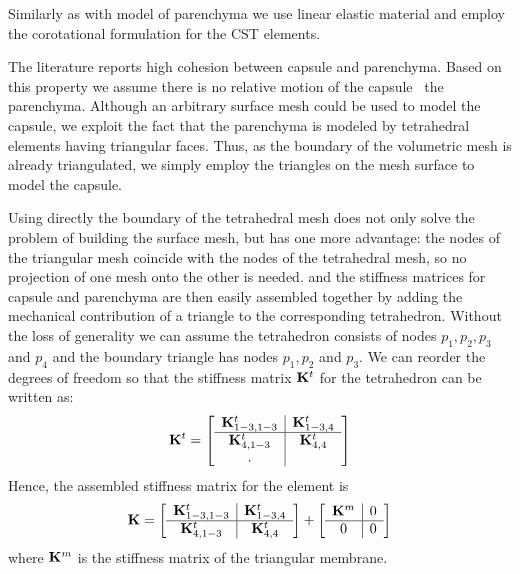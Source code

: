 Similarly as with model of parenchyma we use linear elastic material and employ
the corotational formulation for the CST elements.


The literature reports high cohesion between capsule and parenchyma.
Based on this property we assume there is no relative motion of the capsule \wrt\ the parenchyma.
Although an arbitrary surface mesh could be used to model the capsule, we exploit 
the fact that the parenchyma is modeled by tetrahedral elements having
triangular faces. Thus, as the boundary of the volumetric mesh is already
triangulated, we simply employ the triangles on the mesh surface to model the capsule.

Using directly the boundary of the tetrahedral mesh does not only solve the
problem of building the surface mesh, but has one more advantage: the nodes
of the triangular mesh coincide with the nodes of the tetrahedral mesh, so no projection of one mesh onto the other is needed.
and the stiffness matrices for capsule and parenchyma are then easily assembled together by adding the mechanical contribution 
of a triangle to the corresponding tetrahedron.
%
Without the loss of generality we can assume the tetrahedron consists of
nodes $p_1, p_2, p_3$ and $p_4$ and the boundary triangle has nodes $p_1, p_2$
and $p_3$. We can reorder the degrees of freedom so that the stiffness
matrix $\mathbf{K}^t$ for the tetrahedron can be written as:
%
\begin{equation}
  \mathbf{K}^t = \left[\begin{array}{c|c}
      \mathbf{K}^t_{1-3,1-3} & \mathbf{K}^t_{1-3,4} \\
      \hline
      \mathbf{K}^t_{4,1-3} & \mathbf{K}^t_{4,4} \\.
  \end{array}\right]
\end{equation}
%
Hence, the assembled stiffness matrix for the element is
%
\begin{equation}
  \mathbf{K} = \left[\begin{array}{c|c}
      \mathbf{K}^t_{1-3,1-3} & \mathbf{K}^t_{1-3,4} \\
      \hline
      \mathbf{K}^t_{4,1-3} & \mathbf{K}^t_{4,4} \\
  \end{array}\right]
  +
  \left[\begin{array}{c|c}
      \mathbf{K}^m & 0 \\
      \hline
      0 & 0 \\
  \end{array}\right]
\end{equation}
%
where $\mathbf{K}^m$ is the stiffness matrix of the triangular membrane.


